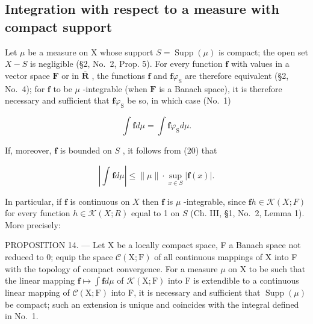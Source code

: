 \subsection{Integration with respect to a measure with compact support}

Let \(\mu\) be a measure on X whose support \(S = \operatorname{Supp}(\mu)\) is compact; the open set \(X - S\) is negligible (§2, No.~2, Prop. 5). For every function \(\mathbf{f}\) with values in a vector space \(\mathbf{F}\) or in \(\overline{\mathbf{R}}\) , the functions \(\mathbf{f}\) and \(\mathbf{f}\varphi_{\mathrm{S}}\) are therefore equivalent (§2, No.~4); for \(\mathbf{f}\) to be \(\mu\) -integrable (when \(\mathbf{F}\) is a Banach space), it is therefore necessary and sufficient that \(\mathbf{f}\varphi_{\mathrm{S}}\) be so, in which case (No.~1)

\[
\int \mathbf {f} d \mu = \int \mathbf {f} \varphi_ {\mathrm{S}} d \mu .\tag{21}
\]

If, moreover, \(\mathbf{f}\) is bounded on \(S\) , it follows from (20) that

\[
\left| \int \mathbf {f} d \mu \right| \leqslant \| \mu \| \cdot \sup _ {x \in S} | \mathbf {f} (x) |.\tag{22}
\]

In particular, if \(\mathbf{f}\) is continuous on \(X\) then \(\mathbf{f}\) is \(\mu\) -integrable, since \(\mathbf{f}h \in \mathcal{K}(X;F)\) for every function \(h \in \mathcal{K}(X;R)\) equal to 1 on \(S\) (Ch. III, §1, No.~2, Lemma 1). More precisely:

PROPOSITION 14. --- Let X be a locally compact space, F a Banach space not reduced to 0; equip the space \(\mathcal{C}(\mathrm{X};\mathrm{F})\) of all continuous mappings of X into F with the topology of compact convergence. For a measure \(\mu\) on X to be such that the linear mapping \(\mathbf{f} \mapsto \int \mathbf{f} d\mu\) of \(\mathcal{K}(\mathrm{X};\mathrm{F})\) into F is extendible to a continuous linear mapping of \(\mathcal{C}(\mathrm{X};\mathrm{F})\) into F, it is necessary and sufficient that \(\operatorname{Supp}(\mu)\) be compact; such an extension is unique and coincides with the integral defined in No.~1.


